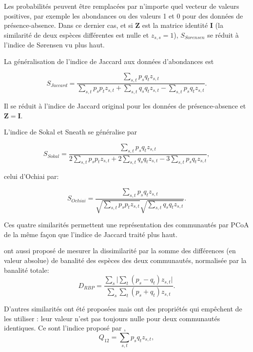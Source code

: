 \documentclass[
  11pt,
  french,
  a4paper,
  extrafontsizes,onecolumn,openright
  ]{memoir}
\begin{document}
Les probabilités peuvent être remplacées par n'importe quel vecteur de valeurs positives, par exemple les abondances ou des valeurs 1 et 0 pour des données de présence-absence.
Dans ce dernier cas, et si \(\mathbf{Z}\) est la matrice identité \(\mathbf{I}\) (la similarité de deux espèces différentes est nulle et \(z_{s,s}=1\)), \(S_{\mathit{Sorensen}}\) se réduit à l'indice de Sørensen vu plus haut.

La généralisation de l'indice de Jaccard aux données d'abondances est

\begin{equation}
  \label{eq:JaccardAbd}
  S_{\mathit{Jaccard}} = \frac{\sum_{s,t}{p_s q_t z_{s,t}}}{\sum_{s,t}{p_s p_t z_{s,t}} + \sum_{s,t}{q_s q_t z_{s,t}} - \sum_{s,t}{p_s q_t z_{s,t}}}.
\end{equation}

Il se réduit à l'indice de Jaccard original pour les données de présence-absence et \(\mathbf{Z} = \mathbf{I}\).

L'indice de Sokal et Sneath se généralise par

\begin{equation}
  \label{eq:SokalAbd}
  S_{\mathit{Sokal}} = \frac{\sum_{s,t}{p_s q_t z_{s,t}}}{2 \sum_{s,t}{p_s p_t z_{s,t}} + 2 \sum_{s,t}{q_s q_t z_{s,t}} - 3 \sum_{s,t}{p_s q_t z_{s,t}}},
\end{equation}

celui d'Ochiai par:

\begin{equation}
  \label{eq:OchiaiAbd}
  S_{\mathit{Ochiai}} = \frac{\sum_{s,t}{p_s q_t z_{s,t}}}{\sqrt{\sum_{s,t}{p_s p_t z_{s,t}}} \sqrt{\sum_{s,t}{q_s q_t z_{s,t}}}}.
\end{equation}

Ces quatre similarités permettent une représentation des communautés par PCoA de la même façon que l'indice de Jaccard traité plus haut.

\textcite{Ricotta2014b} ont aussi proposé de mesurer la dissimilarité par la somme des différences (en valeur absolue) de banalité des espèces des deux communautés, normalisée par la banalité totale:
\begin{equation}
  \label{eq:Ricotta2014b}
  D_{\mathit{RBP}} 
  = \frac{\sum_{s}{|\sum_{t}{(p_s-q_t)z_{s,t}}}|}{\sum_{s}{\sum_{t}{(p_s+q_t)z_{s,t}}}}.
\end{equation}

D'autres similarités ont été proposées mais ont des propriétés qui empêchent de les utiliser \autocite{Ricotta2014b}: leur valeur n'est pas toujours nulle pour deux communautés identiques.
Ce sont l'indice proposé par \textcite{Rao1982},
\begin{equation}
  \label{eq:Rao1982Q12}
  Q_{\mathit{12}} = \sum_{s,t}{p_s q_t z_{s,t}},
\end{equation}
\end{document}
